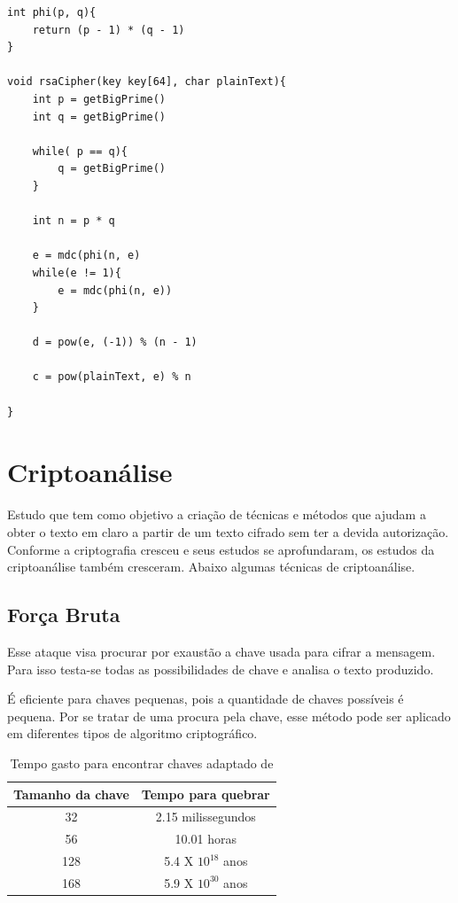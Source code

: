 \begin{lstlisting}[caption={Pseudo-código RSA}, label=rsa-pseudo-code]
int phi(p, q){
	return (p - 1) * (q - 1)
}

void rsaCipher(key key[64], char plainText){
	int p = getBigPrime()
	int q = getBigPrime()
	
	while( p == q){
		q = getBigPrime()
	}
	
	int n = p * q
	
	e = mdc(phi(n, e)
	while(e != 1){
		e = mdc(phi(n, e))
	}
	
	d = pow(e, (-1)) % (n - 1)
	
	c = pow(plainText, e) % n
	
}
    \end{lstlisting}

%
\section{Criptoanálise}
\label{cryptanalysis}

Estudo que tem como objetivo a criação de técnicas e métodos que ajudam a obter o texto em claro a partir de um texto cifrado sem ter a devida autorização. Conforme a criptografia cresceu e seus estudos se aprofundaram, os estudos da criptoanálise também cresceram. Abaixo algumas técnicas de criptoanálise.

\subsection{Força Bruta}
\label{brute-force}

Esse ataque visa procurar por exaustão a chave usada para cifrar a mensagem. Para isso testa-se todas as possibilidades de chave e analisa o texto produzido. 

É eficiente para chaves pequenas, pois a quantidade de chaves possíveis é pequena. Por se tratar de uma procura pela chave, esse método pode ser aplicado em diferentes tipos de algoritmo criptográfico.

\begin{table}[h]
\centering
	\begin{tabular}{ c c }
	\toprule
		Tamanho da chave & Tempo para quebrar \\ \hline
		32 & 2.15 milissegundos \\ \hline
		56 & 10.01 horas \\ \hline
		128 & 5.4 X $ 10 ^{18}$ anos \\ \hline
		168 & 5.9 X $ 10 ^{30}$ anos \\ \hline
	\end{tabular}
\caption[{Tempo gasto para encontrar chaves}] {Tempo gasto para encontrar chaves adaptado de \cite{william-stallings}}
\end{table}

